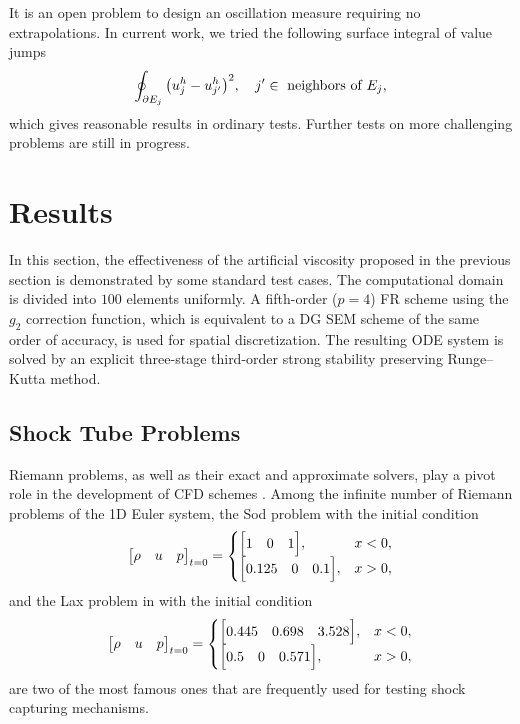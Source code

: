 \documentclass[10pt,draft]{article}
\begin{document}
%
It is an open problem to design an oscillation measure requiring no extrapolations.
%
In current work, we tried the following surface integral of value jumps
$$
\oint_{\partial E_j} \qty(u^h_{j}-u^h_{j'})^2,\quad
j'\in\text{ neighbors of } E_j,
$$
which gives reasonable results in ordinary tests.
%
Further tests on more challenging problems are still in progress.

\section{Results}
In this section, the effectiveness of the artificial viscosity proposed in the previous section is demonstrated by some standard test cases.
The computational domain is divided into $100$ elements uniformly.
A fifth-order ($p=4$) FR scheme using the $g_2$ correction function, which is equivalent to a DG SEM scheme of the same order of accuracy, is used for spatial discretization.
The resulting ODE system is solved by an explicit three-stage third-order strong stability preserving Runge--Kutta method.

\subsection{Shock Tube Problems}
Riemann problems, as well as their exact and approximate solvers, play a pivot role in the development of CFD schemes \cite{Toro_2009}.
Among the infinite number of Riemann problems of the 1D Euler system, the Sod problem with the initial condition
\begin{equation}
\mqty[\rho & u & p]_{t=0}
=
\begin{cases}
\mqty[1 & 0 & 1], &x<0,\\
\mqty[0.125 & 0 & 0.1], &x>0,\\
\end{cases}
\end{equation}
and the Lax problem in with the initial condition
\begin{equation}
\mqty[\rho & u & p]_{t=0}
=
\begin{cases}
\mqty[0.445 & 0.698 & 3.528], &x<0,\\
\mqty[0.5 & 0 & 0.571], &x>0,\\
\end{cases}
\end{equation}
are two of the most famous ones that are frequently used for testing shock capturing mechanisms.
\end{document}
